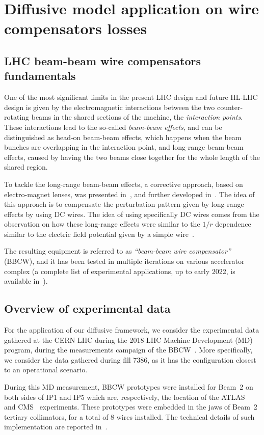 \chapter{Diffusive model application on wire compensators losses}

\section{LHC beam-beam wire compensators fundamentals}

One of the most significant limits in the present LHC design and future HL-LHC design is given by the electromagnetic interactions between the two counter-rotating beams in the shared sections of the machine, the \textit{interaction points}. These interactions lead to the so-called \textit{beam-beam effects}, and can be distinguished as head-on beam-beam effects, which happens when the beam bunches are overlapping in the interaction point, and long-range beam-beam effects, caused by having the two beams close together for the whole length of the shared region.

To tackle the long-range beam-beam effects, a corrective approach, based on electro-magnet lenses, was presented in~\cite{}, and further developed in~\cite{}. The idea of this approach is to compensate the perturbation pattern given by long-range effects by using DC wires. The idea of using specifically DC wires comes from the observation on how these long-range effects were similar to the $1/r$ dependence similar to the electric field potential given by a simple wire~\cite{}.

The resulting equipment is referred to as \textit{``beam-beam wire compensator''} (BBCW), and it has been tested in multiple iterations on various accelerator complex (a complete list of experimental applications, up to early 2022, is available in~\cite{}).

\section{Overview of experimental data}

For the application of our diffusive framework, we consider the experimental data gathered at the CERN LHC during the 2018 LHC Machine Development (MD) program, during the measurements campaign of the BBCW~\cite{}. More specifically, we consider the data gathered during fill 7386, as it has the configuration closest to an operational scenario.

During this MD measurement, BBCW prototypes were installed for Beam~2 on both sides of IP1 and IP5 which are, respectively, the location of the ATLAS~\cite{} and CMS~\cite{} experiments. These prototypes were embedded in the jaws of Beam~2 tertiary collimators, for a total of 8 wires installed. The technical details of such implementation are reported in~\cite{}.

